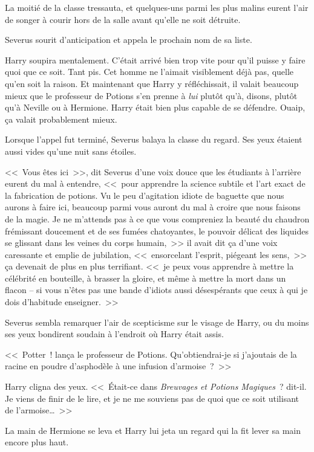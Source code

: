 La moitié de la classe tressauta, et quelques-uns parmi les plus malins eurent l'air de songer à courir hors de la salle avant qu'elle ne soit détruite.

Severus sourit d'anticipation et appela le prochain nom de sa liste.

Harry soupira mentalement. C'était arrivé bien trop vite pour qu'il puisse y faire quoi que ce soit. Tant pis. Cet homme ne l'aimait visiblement déjà pas, quelle qu'en soit la raison. Et maintenant que Harry y réfléchissait, il valait beaucoup mieux que le professeur de Potions s'en prenne à \emph{lui} plutôt qu'à, disons, plutôt qu'à Neville ou à Hermione. Harry était bien plus capable de se défendre. Ouaip, ça valait probablement mieux.

Lorsque l'appel fut terminé, Severus balaya la classe du regard. Ses yeux étaient aussi vides qu'une nuit sans étoiles.

<<~Vous êtes ici~>>, dit Severus d'une voix douce que les étudiants à l'arrière eurent du mal à entendre, <<~pour apprendre la science subtile et l'art exact de la fabrication de potions. Vu le peu d'agitation idiote de baguette que nous aurons à faire ici, beaucoup parmi vous auront du mal à croire que nous faisons de la magie. Je ne m'attends pas à ce que vous compreniez la beauté du chaudron frémissant doucement et de ses fumées chatoyantes, le pouvoir délicat des liquides se glissant dans les veines du corps humain,~>> il avait dit ça d'une voix caressante et emplie de jubilation, <<~ensorcelant l'esprit, piégeant les sens,~>> ça devenait de plus en plus terrifiant. <<~je peux vous apprendre à mettre la célébrité en bouteille, à brasser la gloire, et même à mettre la mort dans un flacon -- si vous n'êtes pas une bande d'idiots aussi désespérants que ceux à qui je dois d'habitude enseigner.~>>

Severus sembla remarquer l'air de scepticisme sur le visage de Harry, ou du moins ses yeux bondirent soudain à l'endroit où Harry était assis.

<<~Potter~! lança le professeur de Potions. Qu'obtiendrai-je si j'ajoutais de la racine en poudre d'asphodèle à une infusion d'armoise~?~>>

Harry cligna des yeux. <<~Était-ce dans \emph{Breuvages et Potions Magiques}~? dit-il. Je viens de finir de le lire, et je ne me souviens pas de quoi que ce soit utilisant de l'armoise…~>>

La main de Hermione se leva et Harry lui jeta un regard qui la fit lever sa main encore plus haut.

